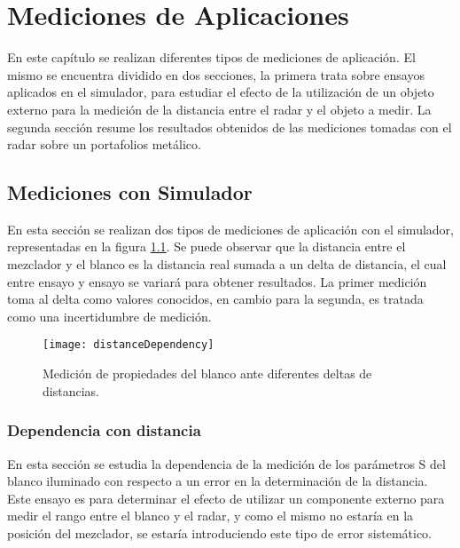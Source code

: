 \chapter{Mediciones de Aplicaciones} \label{ch:measurements}

\ifpdf
    \graphicspath{{Chapter5/Figs/Raster/}{Chapter5/Figs/PDF/}{Chapter5/Figs/}}
\else
    \graphicspath{{Chapter5/Figs/Vector/}{Chapter5/Figs/}}
\fi

En este capítulo se realizan diferentes tipos de mediciones de aplicación. El mismo se encuentra dividido en dos secciones, la primera trata sobre ensayos aplicados en el simulador, para estudiar el efecto de la utilización de un objeto externo para la medición de la distancia entre el radar y el objeto a medir. La segunda sección resume los resultados obtenidos de las mediciones tomadas con el radar sobre un portafolios metálico.


\section{Mediciones con Simulador}

En esta sección se realizan dos tipos de mediciones de aplicación con el simulador, representadas en la figura \ref{fig:DistDependencySim}. Se puede observar que la distancia entre el mezclador y el blanco es la distancia real sumada a un delta de distancia, el cual entre ensayo y ensayo se variará para obtener resultados. La primer medición toma al delta como valores conocidos, en cambio para la segunda, es tratada como una incertidumbre de medición.
\begin{figure}
  \centering
  \texttt{[image: distanceDependency]}
  \caption{Medición de propiedades del blanco ante diferentes deltas de distancias.}
  \label{fig:DistDependencySim}
\end{figure}


\subsection{Dependencia con distancia}

En esta sección se estudia la dependencia de la medición de los parámetros S del blanco iluminado con respecto a un error en la determinación de la distancia. Este ensayo es para determinar el efecto de utilizar un componente externo para medir el rango entre el blanco y el radar, y como el mismo no estaría en la posición del mezclador, se estaría introduciendo este tipo de error sistemático. 

